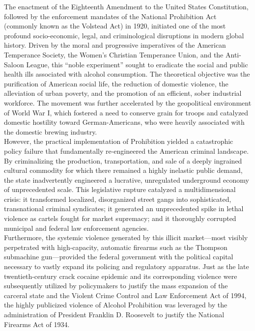 \documentclass[
]{article}
\begin{document}
The enactment of the Eighteenth Amendment to the United States
Constitution, followed by the enforcement mandates of the National
Prohibition Act (commonly known as the Volstead Act) in 1920, initiated
one of the most profound socio-economic, legal, and criminological
disruptions in modern global history. Driven by the moral and
progressive imperatives of the American Temperance Society, the Women's
Christian Temperance Union, and the Anti-Saloon League, this ``noble
experiment'' sought to eradicate the social and public health ills
associated with alcohol consumption. The theoretical objective was the
purification of American social life, the reduction of domestic
violence, the alleviation of urban poverty, and the promotion of an
efficient, sober industrial workforce. The movement was further
accelerated by the geopolitical environment of World War I, which
fostered a need to conserve grain for troops and catalyzed domestic
hostility toward German-Americans, who were heavily associated with the
domestic brewing industry.\\
However, the practical implementation of Prohibition yielded a
catastrophic policy failure that fundamentally re-engineered the
American criminal landscape. By criminalizing the production,
transportation, and sale of a deeply ingrained cultural commodity for
which there remained a highly inelastic public demand, the state
inadvertently engineered a lucrative, unregulated underground economy of
unprecedented scale. This legislative rupture catalyzed a
multidimensional crisis: it transformed localized, disorganized street
gangs into sophisticated, transnational criminal syndicates; it
generated an unprecedented spike in lethal violence as cartels fought
for market supremacy; and it thoroughly corrupted municipal and federal
law enforcement agencies.\\
Furthermore, the systemic violence generated by this illicit
market---most visibly perpetrated with high-capacity, automatic firearms
such as the Thompson submachine gun---provided the federal government
with the political capital necessary to vastly expand its policing and
regulatory apparatus. Just as the late twentieth-century crack cocaine
epidemic and its corresponding violence were subsequently utilized by
policymakers to justify the mass expansion of the carceral state and the
Violent Crime Control and Law Enforcement Act of 1994, the highly
publicized violence of Alcohol Prohibition was leveraged by the
administration of President Franklin D. Roosevelt to justify the
National Firearms Act of 1934.\\
\end{document}
